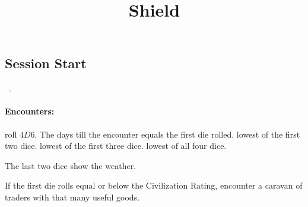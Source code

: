 \documentclass[a4paper,openany]{book}
\title{\Glsentrytext{gm} Shield}
\begin{document}


\cleardoublepage

\begin{figure*}[b!]
  \stackingDamageChart
\end{figure*}

\begin{multicols}{2}

\subsection*{Session Start}



\orrery

\noindent
\showCycle~\cycleDesc.

\paragraph{Encounters:}
roll $4D6$.
The days till the encounter equals the
\ifcase\value{temperature}%
  first die rolled. 
\or%
  lowest of the first two dice.
\or%
  lowest of the first three dice.
\or%
  lowest of all four dice.
\fi

The last two dice show the weather.

\ifcase\value{temperature}%
  \setcounter{enc}{13}
  \setcounter{diceNo}{7}
  \begin{boxtable}[L|r|Lc]
    \hline
  \end{boxtable}
\or%
  \setcounter{enc}{13}
  \begin{boxtable}[L|r|Lc]
  \end{boxtable}
  \setcounter{diceNo}{5}
\else%
  \allEncounterTables%
\fi

If the first die rolls equal or below the Civilization Rating, encounter a caravan of traders with that many useful goods.


\end{multicols}
\end{document}
